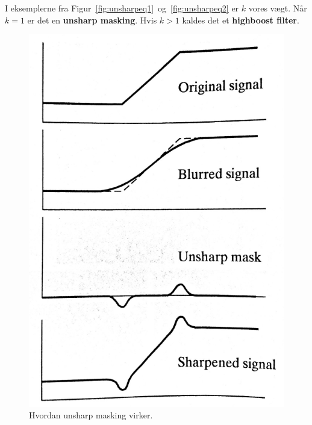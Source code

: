I eksemplerne fra Figur~\ref{fig:unsharpeq1}~og~\ref{fig:unsharpeq2} er $k$ vores vægt. Når $k = 1$ er det en \textbf{unsharp masking}. Hvis $k > 1$ kaldes det et \textbf{highboost filter}.

\begin{figure}[H]
	\centering
	\includegraphics[width=0.4\linewidth]{figs/spm02/unsharp}
	\caption{Hvordan unsharp masking virker.}
	\label{fig:unsharp}
\end{figure}
